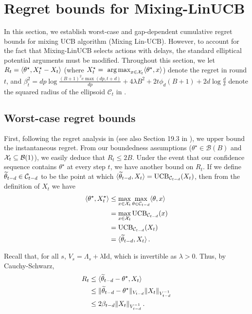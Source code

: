 \section{Regret bounds for Mixing-LinUCB}
\label{sec:bandit_regret}

In this section, we establish worst-case and gap-dependent cumulative regret bounds for mixing UCB algorithm (Mixing Lin-UCB). However, to account for the fact that Mixing-LinUCB selects actions with delays, the standard elliptical potential arguments must be modified. Throughout this section, we let $R_t = \langle\theta^{\star},X_t^{\star} - X_t\rangle$ (where $X_t^\star = \mathop{\mbox{ arg\,max}}_{x\in\mathcal{X}_t}\langle \theta^\star, x\rangle$) denote the regret in round $t$, and $\beta_{t}^2 = dp\log\tfrac{(B+1)^2e\max(dp,t+d)}{dp} + 4\lambda B^2 + 2t\phi_d (B+1) + 2d\log\tfrac{d}{\delta}$ denote the squared radius of the ellipsoid $\mathcal{C}_t$ in . %

\subsection{Worst-case regret bounds}

First, following the regret analysis in \citet{abbasi2011improved} (see also Section 19.3 in \citealp{lattimore2020bandit}), we upper bound the instantaneous regret. From our boundedness assumptions ($\theta^\star\in\mathcal B(B)$ and $\mathcal{X}_t\subseteq\mathcal B(1)$), we easily deduce that $R_t \leq 2B$. Under the event that our confidence sequence contains $\theta^{\star}$ at every step $t$, we have another bound on $R_t$. If we define $\widetilde\theta_{t-d} \in \mathcal{C}_{t-d}$ to be the point at which $\langle\widetilde\theta_{t-d},X_t\rangle = \mathrm{UCB}_{\mathcal{C}_{t-d}}(X_t)$, then from the definition of $X_t$ we have
\begin{align*}
\langle\theta^{\star},X_t^{\star}\rangle &\leq \max_{x \in \mathcal{X}_{t}}\max_{\theta \in \mathcal{C}_{t-d}}\langle\theta,x\rangle\\ &= \max_{x \in \mathcal{X}_{t}} \mathrm{UCB}_{\mathcal{C}_{t-d}}(x) \\&= \mathrm{UCB}_{\mathcal{C}_{t-d}}(X_t)\\&=\langle\widetilde\theta_{t-d},X_t\rangle\,.
\end{align*}

Recall that, for all $s$, $V_s = \Lambda_s + \lambda\mathrm{Id}$, which is invertible as $\lambda>0$. Thus, by Cauchy-Schwarz,
\begin{align*}
R_t &\leq \langle\widetilde\theta_{t-d} - \theta^{\star},X_t\rangle \\
&\leq \|\widetilde\theta_{t-d} - \theta^{\star}\|_{V_{t-d}}\|X_t\|_{V_{t-d}^{-1}} \\
&\leq 2\beta_{t-d}\|X_t\|_{V_{t-d}^{-1}}\,.
\end{align*}

